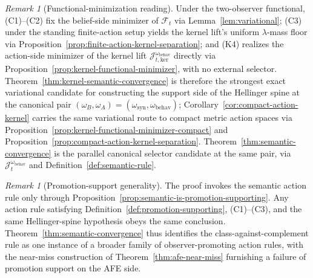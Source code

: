 \documentclass[11pt]{article}
\theoremstyle{definition}
\theoremstyle{remark}
\newtheorem{remark}[theorem]{Remark}
\begin{document}
\begin{remark}[Functional-minimization reading]
\label{rem:functional-payoff}
Under the two-observer functional, (C1)--(C2) fix the belief-side minimizer of $\mathcal F_t$ via Lemma~\ref{lem:variational}; (C3) under the standing finite-action setup yields the kernel lift's uniform $\lambda$-mass floor via Proposition~\ref{prop:finite-action-kernel-separation}; and (K4) realizes the action-side minimizer of the kernel lift $\mathcal J_{t,\mathrm{ker}}^{\omega_{\mathrm{behav}}}$ directly via Proposition~\ref{prop:kernel-functional-minimizer}, with no external selector. Theorem~\ref{thm:kernel-semantic-convergence} is therefore the strongest exact variational candidate for constructing the support side of the Hellinger spine at the canonical pair $(\omega_B,\omega_A)=(\omega_{\mathrm{syn}},\omega_{\mathrm{behav}})$; Corollary~\ref{cor:compact-action-kernel} carries the same variational route to compact metric action spaces via Proposition~\ref{prop:kernel-functional-minimizer-compact} and Proposition~\ref{prop:compact-action-kernel-separation}. Theorem~\ref{thm:semantic-convergence} is the parallel canonical selector candidate at the same pair, via $\mathcal J_t^{\omega_{\mathrm{behav}}}$ and Definition~\ref{def:semantic-rule}.
\end{remark}

\begin{remark}[Promotion-support generality]
\label{rem:promotion-support}
The proof invokes the semantic action rule only through Proposition~\ref{prop:semantic-is-promotion-supporting}. Any action rule satisfying Definition~\ref{def:promotion-supporting}, (C1)--(C3), and the same Hellinger-spine hypothesis obeys the same conclusion. Theorem~\ref{thm:semantic-convergence} thus identifies the class-against-complement rule as one instance of a broader family of observer-promoting action rules, with the near-miss construction of Theorem~\ref{thm:afe-near-miss} furnishing a failure of promotion support on the AFE side.
\end{remark}
\end{document}

